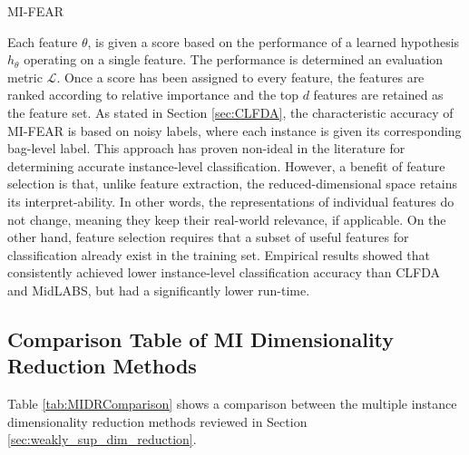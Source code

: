 \begin{algorithm}
	\caption{MI-FEAR}
	\label{alg:MIFEAR}
	\begin{algorithmic}[1]
		\EndFor             
	\end{algorithmic}
\end{algorithm}
\noindent
Each feature $\theta$, is given a score based on the performance of a learned hypothesis $h_{\theta}$ operating on a single feature.  The performance is determined an evaluation metric $\mathcal{L}$.  Once a score has been assigned to every feature, the features are ranked according to relative importance and the top $d$ features are retained as the feature set.  As stated in Section \ref{sec:CLFDA}, the characteristic accuracy of MI-FEAR is based on noisy labels, where each instance is given its corresponding bag-level label.  This approach has proven non-ideal in the literature for determining accurate instance-level classification.  However, a benefit of feature selection is that, unlike feature extraction, the reduced-dimensional space retains its interpret-ability.  In other words, the representations of individual features do not change, meaning they keep their real-world relevance, if applicable.  On the other hand, feature selection requires that a subset of useful features for classification already exist in the training set.  Empirical results showed that consistently achieved lower instance-level classification accuracy than CLFDA and MidLABS, but had a significantly lower run-time.

\subsection{Comparison Table of MI Dimensionality Reduction Methods}
Table \ref{tab:MIDRComparison} shows a comparison between the multiple instance dimensionality reduction methods reviewed in Section \ref{sec:weakly_sup_dim_reduction}.

